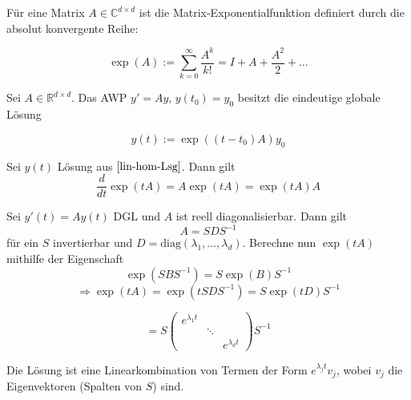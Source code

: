 \documentclass[11pt, a4paper]{article}
\begin{document}
\begin{definition}
Für eine Matrix $A \in \mathbb{C}^{d \times d}$ ist die Matrix-Exponentialfunktion definiert
durch die absolut konvergente Reihe:

\[
\exp(A) := \sum_{k=0}^{\infty} \frac{A^k}{k!}
= I + A + \frac{A^2}{2} + \dots
\]
\end{definition}


\begin{theorem} \label{lin-hom-Lsg}
Sei $A \in \mathbb{R}^{d \times d}$. Das AWP $y'=Ay$, $y(t_0)=y_0$
besitzt die eindeutige globale Lösung

\[
y(t) := \exp((t-t_0)A)y_0
\]
\end{theorem}


\begin{lemma} Sei $y(t)$ Lösung aus $\ref{lin-hom-Lsg}$. Dann gilt
\[
\frac{d}{dt}\exp(tA) = A\exp(tA) = \exp(tA)A
\]
\end{lemma}


\begin{example} Sei $y'(t)=Ay(t)$ DGL und $A$ ist reell diagonalisierbar. Dann gilt 
$$A = SDS^{-1}$$ für ein $S$ invertierbar und $D=\mathrm{diag}(\lambda_1,\dots,\lambda_d)$. Berechne nun $\exp(tA)$ mithilfe der Eigenschaft
$$\exp(SBS^{-1}) = S\exp(B)S^{-1}$$
\[
\Rightarrow\exp(tA) = \exp(tSDS^{-1}) = S\exp(tD)S^{-1}
\]

\[
= S
\begin{pmatrix}
e^{\lambda_1 t} & & \\
&\ddots& \\
& &e^{\lambda_d t}
\end{pmatrix}
S^{-1}
\]

Die Lösung ist eine Linearkombination von Termen der Form $e^{\lambda_j t} v_j$,
wobei $v_j$ die Eigenvektoren (Spalten von $S$) sind.
\end{example}
\end{document}
